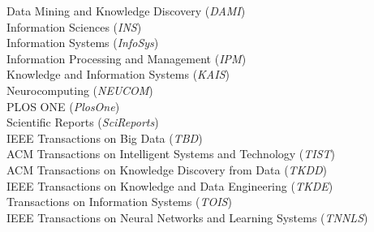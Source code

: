 \documentclass[10pt]{article}
\newenvironment{myindentpar}[1]%
{\begin{list}{}%
         {\setlength{\leftmargin}{#1}}%
         \item[]%
}
{\end{list}}
\newcounter{list}
\begin{document}
\begin{myindentpar}{0.75cm}
{}


\hspace{-0.75cm}{\bf Journal Reviewer}

{\small

Data Mining and Knowledge Discovery (\textit{DAMI}) \\
Information Sciences (\textit{INS}) \\
Information Systems (\textit{InfoSys}) \\
Information Processing and Management (\textit{IPM}) \\
Knowledge and Information Systems (\textit{KAIS}) \\
Neurocomputing (\textit{NEUCOM}) \\
PLOS ONE (\textit{PlosOne}) \\
Scientific Reports (\textit{SciReports}) \\
IEEE Transactions on Big Data (\textit{TBD}) \\
ACM Transactions on Intelligent Systems and Technology (\textit{TIST}) \\
ACM Transactions on Knowledge Discovery from Data (\textit{TKDD}) \\
IEEE Transactions on Knowledge and Data Engineering (\textit{TKDE}) \\
Transactions on Information Systems (\textit{TOIS}) \\
IEEE Transactions on Neural Networks and Learning Systems (\textit{TNNLS})

}

\end{myindentpar}
\end{document}
